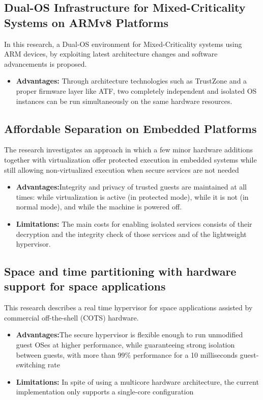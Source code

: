 \documentclass[conference]{IEEEtran}
\begin{document}
\subsection{Dual-OS Infrastructure for Mixed-Criticality Systems on ARMv8 Platforms}
\cite{hyper12} In this research, a Dual-OS environment for Mixed-Criticality systems using ARM devices, by exploiting latest architecture changes and software advancements is proposed.
\begin{itemize}
    \item \textbf{Advantages:} Through architecture technologies such as TrustZone and a proper firmware layer like ATF, two completely independent and isolated OS instances can be run simultaneously on the same hardware resources.
\end{itemize}


\subsection{Affordable Separation on Embedded Platforms}
\cite{hyper13} The research investigates an approach in which a few minor hardware additions together with virtualization offer protected execution in embedded systems while still allowing non-virtualized execution when secure services are not needed
\begin{itemize}
    \item \textbf{Advantages:}Integrity and privacy of trusted guests are maintained at all times: while virtualization is active (in protected mode), while it is not (in normal mode), and while the machine is powered off.
    \item \textbf{Limitations:} The main costs for enabling isolated services consists of their decryption and the integrity check of those services and of the lightweight hypervisor.
\end{itemize}


\subsection{Space and time partitioning with hardware support for space applications}
\cite{hyper14} This research describes a real time hypervisor for space applications assisted by commercial off-the-shell (COTS) hardware.
\begin{itemize}
    \item \textbf{Advantages:}The secure hypervisor is flexible enough to run unmodified guest OSes at higher performance, while guaranteeing strong isolation between guests, with more than $99\%$ performance for a 10 milliseconds guest-switching rate
    \item \textbf{Limitations:} In spite of using a multicore hardware architecture, the current implementation only supports a single-core configuration
\end{itemize}
\end{document}
